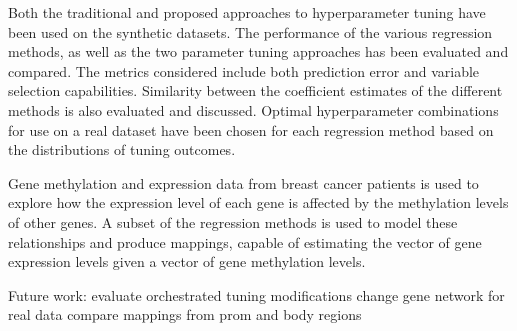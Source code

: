 Both the traditional and proposed approaches to hyperparameter tuning have been used on the synthetic datasets. The performance of the various regression methods, as well as the two parameter tuning approaches has been evaluated and compared. The metrics considered include both prediction error and variable selection capabilities. Similarity between the coefficient estimates of the different methods is also evaluated and discussed. Optimal hyperparameter combinations for use on a real dataset have been chosen for each regression method based on the distributions of tuning outcomes.

Gene methylation and expression data from breast cancer patients is used to explore how the expression level of each gene is affected by the methylation levels of other genes. A subset of the regression methods is used to model these relationships and produce mappings, capable of estimating the vector of gene expression levels given a vector of gene methylation levels.

Future work:
evaluate orchestrated tuning modifications
change gene network for real data
compare mappings from prom and body regions